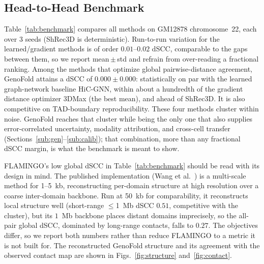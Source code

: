 \documentclass[conference]{IEEEtran}
\providecommand{\gfdscc}{0.000}
\providecommand{\gfdsccstd}{0.000}
\providecommand{\gfnseeds}{3}
\providecommand{\gfbins}{0}
\begin{document}
\subsection{Head-to-Head Benchmark}
Table~\ref{tab:benchmark} compares all methods on GM12878 chromosome~22, each over
\gfnseeds{} seeds (ShRec3D is deterministic). Run-to-run variation for the
learned/gradient methods is of order $0.01$--$0.02$ dSCC, comparable to the gaps
between them, so we report mean\,$\pm$\,std and refrain from over-reading a fractional
ranking. Among the methods that optimize global pairwise-distance agreement, GenoFold
attains a dSCC of $\gfdscc\pm\gfdsccstd$: statistically on par with the learned
graph-network baseline HiC-GNN, within about a hundredth of the gradient distance
optimizer 3DMax (the best mean), and ahead of ShRec3D. It is also competitive on
TAD-boundary reproducibility. These four methods cluster within noise. GenoFold reaches
that cluster while being the only one that also supplies error-correlated uncertainty,
modality attribution, and cross-cell transfer (Sections~\ref{sub:gen}--\ref{sub:calib});
that combination, more than any fractional dSCC margin, is what the benchmark is meant to
show.

FLAMINGO's low global dSCC in Table~\ref{tab:benchmark} should be read with its design
in mind. The published implementation (Wang et al.~\cite{flamingo2022}) is a multi-scale
method for 1--5~kb, reconstructing per-domain structure at high resolution over a coarse
inter-domain backbone. Run at 50~kb for comparability, it reconstructs local structure
well (short-range $\le$1~Mb dSCC $0.51$, competitive with the cluster), but its $1$~Mb
backbone places distant domains imprecisely, so the all-pair global dSCC, dominated by
long-range contacts, falls to $0.27$. The objectives differ, so we report both numbers
rather than reduce FLAMINGO to a metric it is not built for. The
reconstructed GenoFold structure and its agreement with the observed contact map are
shown in Figs.~\ref{fig:structure} and~\ref{fig:contact}.

\begin{table}[t]
\caption{Reconstruction accuracy on GM12878 chromosome~22 (\gfbins{} bins, 50~kb),
all methods scored by dSCC over the same observed pairs, mean\,$\pm$\,std over
\gfnseeds{} seeds (ShRec3D deterministic). TAD $F_1$ is boundary reproducibility;
time is per-run wall-clock on CPU. Best mean in bold. $\ddagger$: the published
FLAMINGO~\cite{flamingo2022} run at 50~kb, below its native 1--5~kb resolution;
its short-range ($\le$1~Mb) dSCC is $0.51$ and global dSCC is dominated by the
long-range pairs its coarse backbone handles least well (see text).}
\label{tab:benchmark}
\centering

\end{table}
\end{document}
